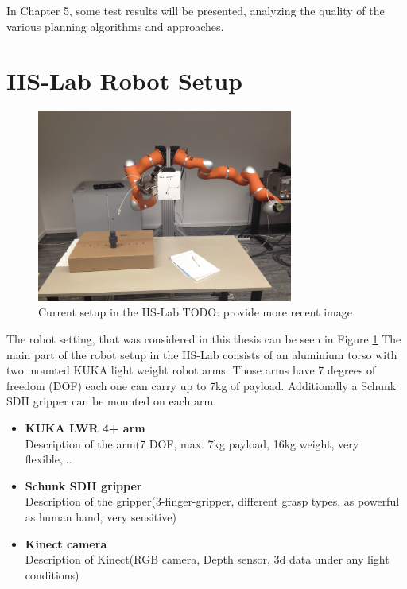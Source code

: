 In Chapter 5, some test results will be presented, analyzing the quality of the various planning algorithms and approaches.

\section{IIS-Lab Robot Setup}
\begin{figure}[ht]
	\centering
  \includegraphics[width=0.75\textwidth]{images/robot_setup.jpg}
	\caption{Current setup in the IIS-Lab TODO: provide more recent image}
	\label{fig:fig1}
\end{figure}

The robot setting, that was considered in this thesis can be seen in Figure \ref{fig:fig1}
The main part of the robot setup in the IIS-Lab consists of an aluminium torso with two mounted KUKA light weight robot arms. Those arms have 7 degrees of freedom (DOF) each one can carry up to 7kg of payload. Additionally a Schunk SDH gripper can be mounted on each arm.

\begin{itemize}
	\item \textbf{KUKA LWR 4+ arm}\\
		Description of the arm(7 DOF, max. 7kg payload, 16kg weight, very flexible,...
	\item \textbf{Schunk SDH gripper}\\
		Description of the gripper(3-finger-gripper, different grasp types, as powerful as human hand, very sensitive)
	\item \textbf{Kinect camera}\\
		Description of Kinect(RGB camera, Depth sensor, 3d data under any light conditions)
\end{itemize}


